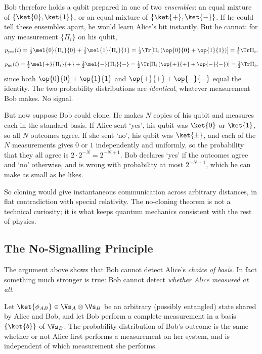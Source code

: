 Bob therefore holds a qubit prepared in one of two \emph{ensembles}: an equal mixture of $\{\ket{0},\ket{1}\}$, or an equal mixture of $\{\ket{+},\ket{-}\}$. If he could tell these ensembles apart, he would learn Alice's bit instantly. But he cannot: for any measurement $\{\Pi_i\}$ on his qubit,
$$p_{\text{yes}}(i) = \tfrac12\mel{0}{\Pi_i}{0} + \tfrac12\mel{1}{\Pi_i}{1} = \tfrac12\Tr\!\left[\Pi_i\left(\op{0}{0}+\op{1}{1}\right)\right] = \tfrac12 \Tr \Pi_i,$$
$$p_{\text{no}}(i) = \tfrac12\mel{+}{\Pi_i}{+} + \tfrac12\mel{-}{\Pi_i}{-} = \tfrac12\Tr\!\left[\Pi_i\left(\op{+}{+}+\op{-}{-}\right)\right] = \tfrac12\Tr\Pi_i,$$
since both $\op{0}{0}+\op{1}{1}$ and $\op{+}{+}+\op{-}{-}$ equal the identity. The two probability distributions are \emph{identical}, whatever measurement Bob makes. No signal.

But now suppose Bob could clone. He makes $N$ copies of his qubit and measures each in the standard basis. If Alice sent `yes', his qubit was $\ket{0}$ or $\ket{1}$, so all $N$ outcomes agree. If she sent `no', his qubit was $\ket{\pm}$, and each of the $N$ measurements gives $0$ or $1$ independently and uniformly, so the probability that they all agree is $2\cdot 2^{-N} = 2^{-N+1}$. Bob declares `yes' if the outcomes agree and `no' otherwise, and is wrong with probability at most $2^{-N+1}$, which he can make as small as he likes.

So cloning would give instantaneous communication across arbitrary distances, in flat contradiction with special relativity. The no-cloning theorem is not a technical curiosity; it is what keeps quantum mechanics consistent with the rest of physics.

\subsection{The No-Signalling Principle}\label{sec:nosignal}

The argument above shows that Bob cannot detect Alice's \emph{choice of basis}. In fact something much stronger is true: Bob cannot detect \emph{whether Alice measured at all}.

\begin{theorem}
	Let $\ket{\phi_{AB}} \in \Vs_A \otimes \Vs_B$ be an arbitrary (possibly entangled) state shared by Alice and Bob, and let Bob perform a complete measurement in a basis $\{\ket{b}\}$ of $\Vs_B$. The probability distribution of Bob's outcome is the same whether or not Alice first performs a measurement on her system, and is independent of which measurement she performs.
\end{theorem}


